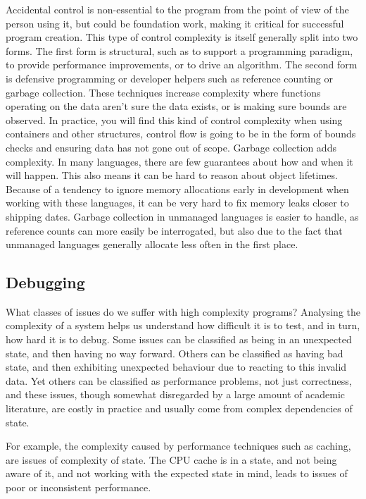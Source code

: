 \documentclass[a4paper,12pt]{article}
\begin{document}
Accidental control is non-essential to the program from the point of view of the person using it, but could be foundation work, making it critical for successful program creation.
This type of control complexity is itself generally split into two forms.
The first form is structural, such as to support a programming paradigm, to provide performance improvements, or to drive an algorithm.
The second form is defensive programming or developer helpers such as reference counting or garbage collection.
These techniques increase complexity where functions operating on the data aren't sure the data exists, or is making sure bounds are observed.
In practice, you will find this kind of control complexity when using containers and other structures, control flow is going to be in the form of bounds checks and ensuring data has not gone out of scope.
Garbage collection adds complexity.
In many languages, there are few guarantees about how and when it will happen.
This also means it can be hard to reason about object lifetimes.
Because of a tendency to ignore memory allocations early in development when working with these languages, it can be very hard to fix memory leaks closer to shipping dates.
Garbage collection in unmanaged languages is easier to handle, as reference counts can more easily be interrogated, but also due to the fact that unmanaged languages generally allocate less often in the first place.

\subsection{Debugging}

What classes of issues do we suffer with high complexity programs?
Analysing the complexity of a system helps us understand how difficult it is to test, and in turn, how hard it is to debug.
Some issues can be classified as being in an unexpected state, and then having no way forward.
Others can be classified as having bad state, and then exhibiting unexpected behaviour due to reacting to this invalid data.
Yet others can be classified as performance problems, not just correctness, and these issues, though somewhat disregarded by a large amount of academic literature, are costly in practice and usually come from complex dependencies of state.

For example, the complexity caused by performance techniques such as caching, are issues of complexity of state.
The CPU cache is in a state, and not being aware of it, and not working with the expected state in mind, leads to issues of poor or inconsistent performance.
\end{document}
